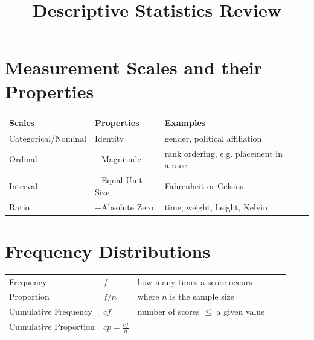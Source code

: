 \documentclass{tufte-handout}
\title{Descriptive Statistics Review}
\date{} %
\begin{document}
\maketitle%



\section{Measurement Scales and their Properties}

\begin{table}
  \centering
  \selectfont
  \begin{tabular}{lllll}
    \toprule
    Scales & Properties & Examples \\
    \midrule
    Categorical/Nominal & Identity & gender, political affiliation\\
    Ordinal & +Magnitude & rank ordering, e.g. placement in a race\\
    Interval & +Equal Unit Size & Fahrenheit or Celsius\\
    Ratio & +Absolute Zero & time, weight, height, Kelvin\\
    \bottomrule
  \end{tabular}
  \label{tab:normaltab}
\end{table}


\section{Frequency Distributions}

\begin{table}
  \centering
  \selectfont
  \begin{tabular}{lllll}
    \toprule
    Frequency & $f$ & how many times a score occurs\\
    Proportion & $f/n$ & where $n$ is the sample size\\
    Cumulative Frequency & $cf$ & number of scores $\leq$ a given value\\
    Cumulative Proportion & $cp=\frac{cf}{n}$ \\
    \bottomrule
  \end{tabular}
  \label{tab:normaltab}
\end{table}
\end{document}
